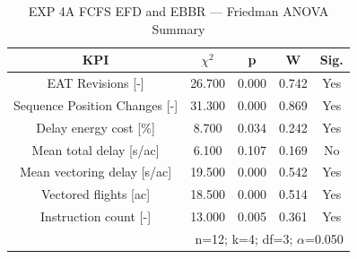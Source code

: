 \begin{table}[!t]
\caption{EXP 4A FCFS EFD and EBBR — Friedman ANOVA Summary}
\begin{center}
\footnotesize
\setlength{\tabcolsep}{3pt}
\renewcommand{\arraystretch}{1.000}
\begin{tabular}{|c|c|c|c|c|}
\hline
\textbf{KPI} & \textbf{$\chi^2$} & \textbf{p} & \textbf{W} & \textbf{Sig.} \\
\hline
EAT Revisions [-] & 26.700 & 0.000 & 0.742 & Yes \\
\hline
Sequence Position Changes [-] & 31.300 & 0.000 & 0.869 & Yes \\
\hline
Delay energy cost [\%] & 8.700 & 0.034 & 0.242 & Yes \\
\hline
Mean total delay [s/ac] & 6.100 & 0.107 & 0.169 & No \\
\hline
Mean vectoring delay [s/ac] & 19.500 & 0.000 & 0.542 & Yes \\
\hline
Vectored flights [ac] & 18.500 & 0.000 & 0.514 & Yes \\
\hline
Instruction count [-] & 13.000 & 0.005 & 0.361 & Yes \\
\hline
\multicolumn{5}{r}{n=12; k=4; df=3; $\alpha$=0.050}\\
\end{tabular}
\label{tab:exp\_4a\_fcfs\_efd\_and\_ebbr\_friedman}
\end{center}
\end{table}